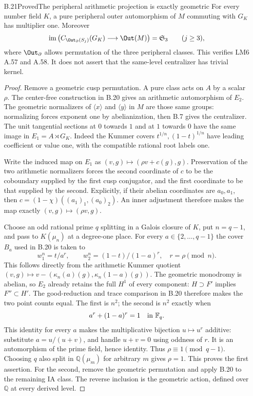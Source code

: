 \begin{statement}{B.21}{Proved}{The peripheral arithmetic projection is exactly geometric}
For every number field $K$, a pure peripheral outer automorphism
of $M$ commuting with $G_K$ has multiplier one. Moreover
\[
 \operatorname{im}\left(
 C_{\Out_{\partial}(S_j)}(G_K)\longrightarrow\Out(M)\right)
                  =\mathfrak S_3\qquad(j\geq3),
\]
where $\Out_{\partial}$ allows permutation of the three peripheral
classes. This verifies LM6 A.57 and A.58. It does not assert that
the same-level centralizer has trivial kernel.
\end{statement}
\begin{proof}
Remove a geometric cusp permutation. A pure class acts on $A$
by a scalar $\rho$. The center-free construction in B.20 gives
an arithmetic automorphism of $E_2$.
The geometric normalizers of $\langle x\rangle$ and
$\langle y\rangle$ in $M$ are those same groups: normalizing
forces exponent one by abelianization, then B.7 gives the
centralizer. The unit tangential sections at $0$ towards $1$
and at $1$ towards $0$ have the same image in
$E_1=A\rtimes G_K$. Indeed the Kummer covers
$t^{1/n},(1-t)^{1/n}$ have leading coefficient or value one,
with the compatible rational root labels one.

Write the induced map on $E_1$ as
$(v,g)\mapsto(\rho v+c(g),g)$.
Preservation of the two arithmetic normalizers forces the second
coordinate of $c$ to be the coboundary supplied by the first
cusp conjugator, and the first coordinate to be that supplied
by the second. Explicitly, if their abelian coordinates are
$a_0,a_1$, then
$c=(1-\chi)((a_1)_1,(a_0)_2)$.
An inner adjustment therefore makes the map exactly
$(v,g)\mapsto(\rho v,g)$.

Choose an odd rational prime $q$ splitting in a Galois closure
of $K$, put $n=q-1$, and pass to $K(\mu_n)$ at a degree-one
place. For every $a\in\{2,\ldots,q-1\}$ the cover $B_a$ used
in B.20 is taken to
\[
       w_1^n=t/a^r,\qquad
       w_2^n=(1-t)/(1-a)^r,
            \quad r=\rho\pmod n.
\]
This follows directly from the arithmetic Kummer quotient
$(v,g)\mapsto v-(\kappa_n(a)(g),\kappa_n(1-a)(g))$.
The geometric monodromy is abelian, so $E_2$ already retains
the full $H^1$ of every component: $H\supset F'$ implies
$F''\subset H'$. The good-reduction and trace comparison in
B.20 therefore makes the two point counts equal. The first is
$n^2$; the second is $n^2$ exactly when
\[
                         a^r+(1-a)^r=1\quad\hbox{in }\mathbb F_q.
\]
This identity for every $a$ makes the multiplicative bijection
$u\mapsto u^r$ additive: substitute $a=u/(u+v)$, and handle
$u+v=0$ using oddness of $r$. It is an automorphism of the
prime field, hence identity. Thus $\rho\equiv1\pmod{q-1}$.
Choosing $q$ also split in $\mathbb Q(\mu_m)$ for arbitrary
$m$ gives $\rho=1$. This proves the first assertion.
For the second, remove the geometric permutation and apply
B.20 to the remaining IA class. The reverse inclusion is the
geometric action, defined over $\mathbb Q$ at every derived level.
\end{proof}


